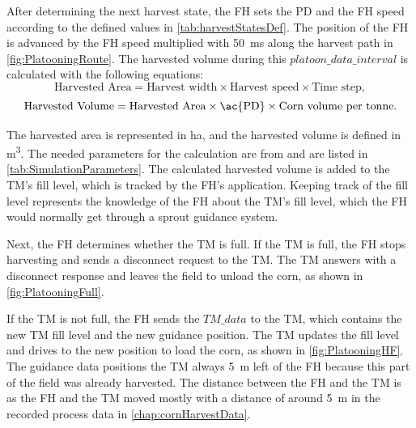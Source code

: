 After determining the next harvest state, the \ac{FH} sets the \ac{PD} and the \ac{FH} speed according to the defined values in
\autoref{tab:harvestStatesDef}.
The position of the \ac{FH} is advanced by the \ac{FH} speed multiplied with \SI{50}{\milli\second} along the
harvest path in \autoref{fig:PlatooningRoute}.
The harvested volume during this $platoon\_data\_interval$ is calculated with the following
equations:
\begin{equation}
   \label{eq:AreaCalculation}
   \text{Harvested Area} =
      \text{Harvest width} \times \text{Harvest speed} \times \text{Time step}
   ,
\end{equation}
\begin{equation}
   \label{eq:VolumneCalculation}
   \text{Harvested Volume} =
   \text{Harvested Area} \times \text{\ac{PD}} \times \text{Corn volume per tonne}.
\end{equation}

The harvested area is represented in \si{\hectare}, and
the harvested volume is defined in \si{\cubic\metre}.
The needed parameters for the calculation are from \cite{faustzahlen2018} and are listed in \autoref{tab:SimulationParameters}.
The calculated harvested volume is added to the \ac{TM}'s fill level, which is tracked by the \ac{FH}'s application.
Keeping track of the fill level represents the knowledge of the \ac{FH} about the \ac{TM}'s fill level, which the \ac{FH} would
normally get through a sprout guidance system.

Next, the \ac{FH} determines whether the \ac{TM} is full.
If the \ac{TM} is full, the \ac{FH} stops harvesting and sends a disconnect request to the \ac{TM}.
The \ac{TM} answers with a disconnect response and leaves the field to unload the corn, as shown in \autoref{fig:PlatooningFull}.



If the \ac{TM} is not full, the \ac{FH} sends the $TM\_data$ to the \ac{TM},
which contains the new \ac{TM} fill level and the new guidance position.
The \ac{TM} updates the fill level and drives to the new position to load the corn, as shown in \autoref{fig:PlatooningHF}.
The guidance data positions the \ac{TM} always \SI{5}{\metre} left of the \ac{FH} because this part of the field was already harvested.
The distance between the \ac{FH} and the \ac{TM} is  as the \ac{FH} and the \ac{TM} moved mostly with a distance of around \SI{5}{\metre} in
the recorded process data in \autoref{chap:cornHarvestData}.

